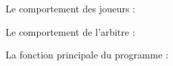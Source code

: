 \documentclass{beamer}
\begin{document}
\begin{frame}[containsverbatim]

  Le comportement des joueurs :

  \vfill

  

\end{frame}

\begin{frame}[containsverbatim]

  Le comportement de l'arbitre :

  \vfill

  

\end{frame}

\begin{frame}[containsverbatim]

  La fonction principale du programme :

  \vfill

  

\end{frame}



\end{document}

